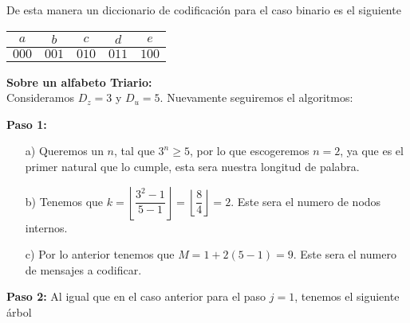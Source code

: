 \begin{sols}
\begin{center}
    \end{center}
De esta manera un diccionario de codificación para el caso binario es el siguiente
\begin{center}
  \begin{tabular}{|c|c|c|c|c|}
  \hline
$a$ & $b$ & $c$ & $d$ & $e$\\
\hline
$000$ & $001$ & $010$ & $011$ & $100$\\
\hline
 \end{tabular}
 \end{center}

\textbf{Sobre un alfabeto Triario:}\\

Consideramos $D_z=3$ y $D_u=5.$ Nuevamente seguiremos el algoritmos:

\textbf{Paso 1:}
\begin{itemize}
    \item[a)] Queremos un $n$, tal que $3^n\geq 5$, por lo que escogeremos $n=2$, ya que es el primer natural que lo cumple, esta sera nuestra longitud de palabra.
    \item[b)] Tenemos que $k=\left\lfloor\dfrac{3^2-1}{5-1}\right\rfloor=\left\lfloor\dfrac{8}{4}\right\rfloor=2.$ Este sera el numero de nodos internos.
    \item[c)] Por lo anterior tenemos que $M=1+2(5-1)=9.$ Este sera el numero de mensajes a codificar.
\end{itemize}
\textbf{Paso 2:}
Al igual que en el caso anterior para el paso $j=1$, tenemos el siguiente árbol


\end{sols}
